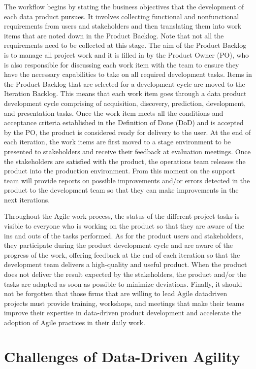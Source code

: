 \documentclass[
  letterpaper,
  DIV=11,
  numbers=noendperiod]{scrreprt}
\begin{document}
The workflow begins by stating the business objectives that the
development of each data product pursues. It involves collecting
functional and nonfunctional requirements from users and stakeholders
and then translating them into work items that are noted down in the
Product Backlog. Note that not all the requirements need to be collected
at this stage. The aim of the Product Backlog is to manage all project
work and it is filled in by the Product Owner (PO), who is also
responsible for discussing each work item with the team to ensure they
have the necessary capabilities to take on all required development
tasks. Items in the Product Backlog that are selected for a development
cycle are moved to the Iteration Backlog. This means that each work item
goes through a data product development cycle comprising of acquisition,
discovery, prediction, development, and presentation tasks. Once the
work item meets all the conditions and acceptance criteria established
in the Definition of Done (DoD) and is accepted by the PO, the product
is considered ready for delivery to the user. At the end of each
iteration, the work items are first moved to a stage environment to be
presented to stakeholders and receive their feedback at evaluation
meetings. Once the stakeholders are satisfied with the product, the
operations team releases the product into the production environment.
From this moment on the support team will provide reports on possible
improvements and/or errors detected in the product to the development
team so that they can make improvements in the next iterations.

Throughout the Agile work process, the status of the different project
tasks is visible to everyone who is working on the product so that they
are aware of the ins and outs of the tasks performed. As for the product
users and stakeholders, they participate during the product development
cycle and are aware of the progress of the work, offering feedback at
the end of each iteration so that the development team delivers a
high-quality and useful product. When the product does not deliver the
result expected by the stakeholders, the product and/or the tasks are
adapted as soon as possible to minimize deviations. Finally, it should
not be forgotten that those firms that are willing to lead Agile
datadriven projects must provide training, workshops, and meetings that
make their teams improve their expertise in data-driven product
development and accelerate the adoption of Agile practices in their
daily work.

\hypertarget{challenges-of-data-driven-agility}{%
\section{Challenges of Data-Driven
Agility}\label{challenges-of-data-driven-agility}}
\end{document}
